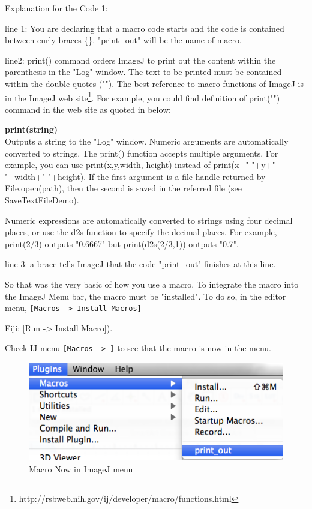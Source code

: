 \documentclass[11pt,a4paper,oneside]{report}
\newenvironment{indentFiji}%
{\begin{list}{}%
         {\setlength{\leftmargin}{1em}}%
         \item[]%
}
{\end{list}}
\newenvironment{indentCom}%
{\begin{list}{}%
         {\setlength{\leftmargin}{1em}}%
         \item[]%
}
{\end{list}}
\newcommand{\ijmenu}[1]{\texttt{\small#1}}
\begin{document}
Explanation for the Code 1:\\
\begin{itemize}
\item line 1: You are declaring that a macro code starts and the code is contained between  curly braces \{\}. "print\_out" will be the name of macro. 

\item line2: print() command orders ImageJ to print out the content within the parenthesis in the "Log" window. The text to be printed must be contained within the double quotes (""). The best reference to macro functions of ImageJ is in the ImageJ web site\footnote{ http://rsbweb.nih.gov/ij/developer/macro/functions.html}. For example, you could find definition of print("") command in the web site as quoted in below:\\
\begin{indentCom}
\textbf{print(string)}\\
Outputs a string to the "Log" window. Numeric arguments are automatically converted to strings. The print() function accepts multiple arguments. For example, you can use print(x,y,width, height) instead of print(x+" "+y+" "+width+" "+height). If the first argument is a file handle returned by File.open(path), then the second is saved in the referred file (see SaveTextFileDemo).

Numeric expressions are automatically converted to strings using four decimal places, or use the d2s function to specify the decimal places. For example, print(2/3) outputs "0.6667" but print(d2s(2/3,1)) outputs "0.7".
\end{indentCom}

\item line 3: a brace tells ImageJ that the code "print\_out" finishes at this line.  
\end{itemize}
So that was the very basic of how you use a macro. To integrate the macro into the ImageJ Menu bar, the macro must be "installed". To do so, in the editor menu, \ijmenu{[Macros -> Install Macros]} 
\begin{indentFiji}
Fiji: [Run -> Install Macro]).
\end{indentFiji}
Check IJ menu \ijmenu{[Macros -> ]} to see that the macro is now in the menu.\\

\begin{figure}[htbp]
\begin{center}
\includegraphics[scale=0.6]{fig/firstMacroInMenu.png}
\caption{Macro Now in ImageJ menu} \label{fig_MacroInMenu}
\end{center}
\end{figure}
\end{document}
